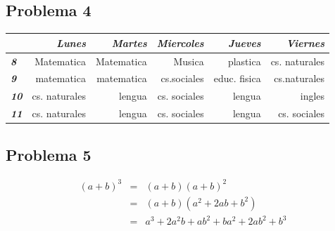 \documentclass[11pt,spanish,a4paper]{article}
\begin{document}
\subsection{Problema 4}

\begin{table}[ht]
\centering
\begin{tabular}{|l||r|r|r|r|r|}\hline
 & {\bfseries\itshape Lunes} & {\bfseries\itshape Martes} & {\bfseries\itshape Miercoles} & {\bfseries\itshape Jueves} & {\bfseries\itshape Viernes}\\ \hline\hline
{\bfseries\itshape 8} & Matematica & Matematica & Musica & plastica & cs. naturales\\
{\bfseries\itshape 9} & matematica & matematica & cs.sociales & educ. fisica & cs.naturales\\
{\bfseries\itshape 10} & cs. naturales & lengua & cs. sociales & lengua & ingles \\
{\bfseries\itshape 11} & cs. naturales & lengua & cs. sociales & lengua & cs. sociales\\ \hline
\end{tabular}
\end{table}

\subsection{Problema 5}

\begin{eqnarray*}
(a+b)^3 & = &  (a+b)(a+b)^2\\
& = & (a+b)(a^2+2ab+b^2)\\
& = & a^3+2a^2b+ab^2+ba^2+2ab^2+b^3\\
\end{eqnarray*}
\end{document}
